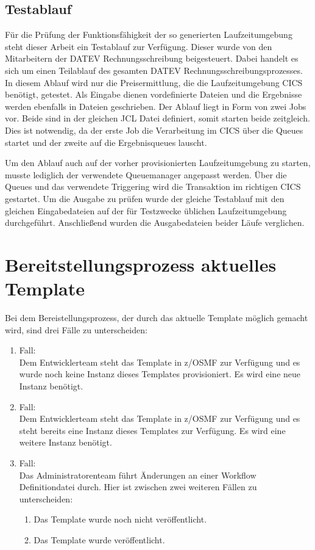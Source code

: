 \subsection{Testablauf}
Für die Prüfung der Funktionsfähigkeit der so generierten Laufzeitumgebung steht dieser Arbeit ein Testablauf zur Verfügung.
Dieser wurde von den Mitarbeitern der DATEV Rechnungsschreibung beigesteuert.
Dabei handelt es sich um einen Teilablauf des gesamten DATEV Rechnungsschreibungsprozesses.
In diesem Ablauf wird nur die Preisermittlung, die die Laufzeitumgebung CICS benötigt, getestet.
Als Eingabe dienen vordefinierte Dateien und die Ergebnisse werden ebenfalls in Dateien geschrieben.
Der Ablauf liegt in Form von zwei Jobs vor.
Beide sind in der gleichen JCL Datei definiert, somit starten beide zeitgleich.
Dies ist notwendig, da der erste Job die Verarbeitung im CICS über die Queues startet und der zweite auf die Ergebnisqueues lauscht.

Um den Ablauf auch auf der vorher provisionierten Laufzeitumgebung zu starten, musste lediglich der verwendete Queuemanager angepasst werden.
Über die Queues und das verwendete Triggering wird die Transaktion im richtigen CICS gestartet.
Um die Ausgabe zu prüfen wurde der gleiche Testablauf mit den gleichen Eingabedateien auf der für Testzwecke üblichen Laufzeitumgebung durchgeführt.
Anschließend wurden die Ausgabedateien beider Läufe verglichen.

\section{Bereitstellungsprozess aktuelles Template}\label{sec:akttemp}
Bei dem Bereistellungsprozess, der durch das aktuelle Template möglich gemacht wird, sind drei Fälle zu unterscheiden:

\begin{samepage}
\begin{enumerate}
\item Fall:\\
Dem Entwicklerteam steht das Template in z/OSMF zur Verfügung und es wurde noch keine Instanz dieses Templates provisioniert.
Es wird eine neue Instanz benötigt.
\item Fall:\\
Dem Entwicklerteam steht das Template in z/OSMF zur Verfügung und es steht bereits eine Instanz dieses Templates zur Verfügung.
Es wird eine weitere Instanz benötigt.
\item Fall:\\
Das Administratorenteam führt Änderungen an einer Workflow Definitiondatei durch.
Hier ist zwischen zwei weiteren Fällen zu unterscheiden:
\begin{enumerate}
\item Das Template wurde noch nicht veröffentlicht.
\item Das Template wurde veröffentlicht.
\end{enumerate}
\end{enumerate}
\end{samepage}


